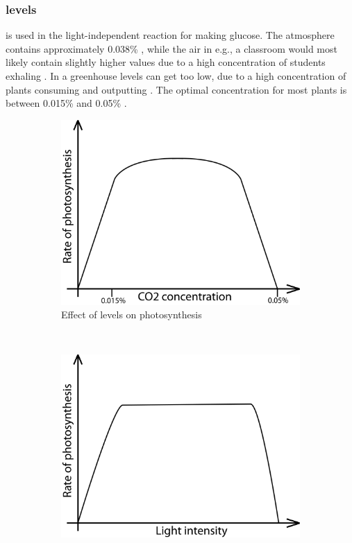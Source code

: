\subsubsection{ levels}
 is used in the light-independent reaction for making glucose. The atmosphere contains approximately 0.038\% , while the air in e.g., a classroom would most likely contain slightly higher values due to a high concentration of students exhaling . In a greenhouse  levels can get too low, due to a high concentration of plants consuming  and outputting . The optimal concentration for most plants is between 0.015\% and 0.05\% \citep{bios}. 


\begin{figure}
        \centering
        \begin{subfigure}[b]{0.45\textwidth}
                \includegraphics[width=\textwidth]{img/photosynthesis/co2.png}
                \caption{Effect of  levels on photosynthesis}
                \label{fig:co2levels}
        \end{subfigure}
        ~~
        \begin{subfigure}[b]{0.45\textwidth}
                \includegraphics[width=\textwidth]{img/photosynthesis/light_intensity.png}

\end{subfigure}
\end{figure}
